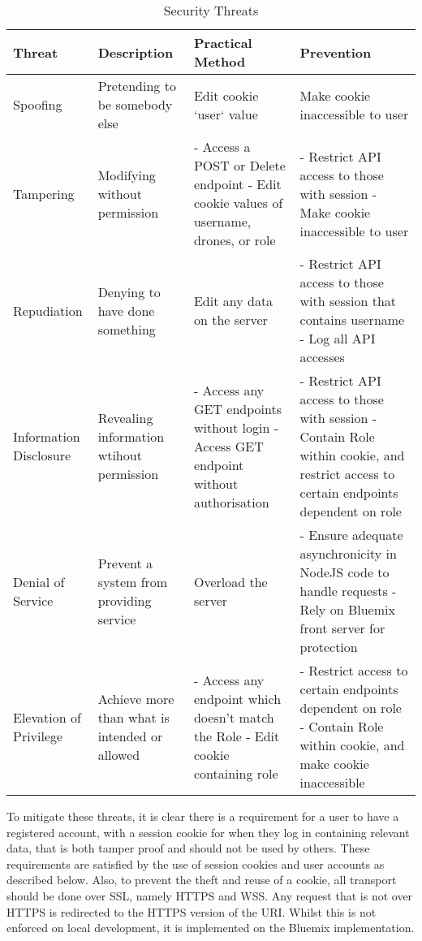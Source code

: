 \documentclass{article}
\begin{document}
\begin{table}[ht]  
\caption{Security Threats\label{tab:SecurityThreats}}
\centering
\renewcommand{\arraystretch}{2}
\begin{tabularx}{\textwidth}{>{\centering}p{1.5cm} >{\centering}X X X}
Threat & Description & Practical Method & Prevention \\ [0.5ex]
\hline
Spoofing & Pretending to be somebody else & Edit cookie `user` value & Make cookie inaccessible to user \\
Tampering & Modifying without permission & - Access a POST or Delete endpoint \newline - Edit cookie values of username, drones, or role & - Restrict API access to those with session \newline - Make cookie inaccessible to user \\ 
Repudiation & Denying to have done something & Edit any data on the server & - Restrict API access to those with session that contains username \newline - Log all API accesses \\
Information Disclosure & Revealing information wtihout permission & - Access any GET endpoints without login \newline - Access GET endpoint without authorisation & - Restrict API access to those with session \newline - Contain Role within cookie, and restrict access to certain endpoints dependent on role \\
Denial of Service & Prevent a system from providing service & Overload the server & - Ensure adequate asynchronicity in NodeJS code to handle requests \newline - Rely on Bluemix front server for protection \\
Elevation of Privilege & Achieve more than what is intended or allowed & - Access any endpoint which doesn't match the Role \newline - Edit cookie containing role & - Restrict access to certain endpoints dependent on role \newline - Contain Role within cookie, and make cookie inaccessible \\
\hline
\end{tabularx}
\label{table:securityThreats}
\end{table}
To mitigate these threats, it is clear there is a requirement for a user to have a registered account, with a session cookie for when they log in containing relevant data, that is both tamper proof and should not be used by others. These requirements are satisfied by the use of session cookies and user accounts as described below. Also, to prevent the theft and reuse of a cookie, all transport should be done over SSL, namely HTTPS and WSS. Any request that is not over HTTPS is redirected to the HTTPS version of the URI. Whilst this is not enforced on local development, it is implemented on the Bluemix implementation.
\end{document}
